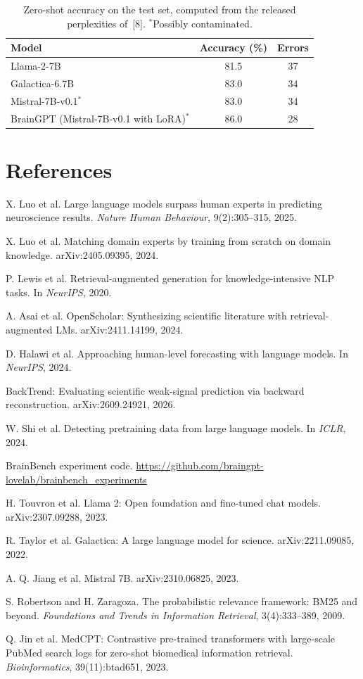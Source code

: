 \documentclass[10pt,a4paper]{article}
\begin{document}
\begin{table}[h]
\centering\small
\caption{Zero-shot accuracy on the test set, computed from the released perplexities of~[8]. $^{*}$Possibly contaminated.}
\label{tab:prelim}
\begin{tabular}{lcc}
\toprule
Model & Accuracy (\%) & Errors \\
\midrule
Llama-2-7B & 81.5 & 37 \\
Galactica-6.7B & 83.0 & 34 \\
Mistral-7B-v0.1$^{*}$ & 83.0 & 34 \\
BrainGPT (Mistral-7B-v0.1 with LoRA)$^{*}$ & 86.0 & 28 \\
\bottomrule
\end{tabular}
\end{table}

\section*{References}
\footnotesize
\begin{enumerate}[label={[\arabic*]},leftmargin=2em]
\item X. Luo et al. Large language models surpass human experts in predicting neuroscience results. \emph{Nature Human Behaviour}, 9(2):305--315, 2025.
\item X. Luo et al. Matching domain experts by training from scratch on domain knowledge. arXiv:2405.09395, 2024.
\item P. Lewis et al. Retrieval-augmented generation for knowledge-intensive NLP tasks. In \emph{NeurIPS}, 2020.
\item A. Asai et al. OpenScholar: Synthesizing scientific literature with retrieval-augmented LMs. arXiv:2411.14199, 2024.
\item D. Halawi et al. Approaching human-level forecasting with language models. In \emph{NeurIPS}, 2024.
\item BackTrend: Evaluating scientific weak-signal prediction via backward reconstruction. arXiv:2609.24921, 2026.
\item W. Shi et al. Detecting pretraining data from large language models. In \emph{ICLR}, 2024.
\item BrainBench experiment code. \url{https://github.com/braingpt-lovelab/brainbench_experiments}
\item H. Touvron et al. Llama 2: Open foundation and fine-tuned chat models. arXiv:2307.09288, 2023.
\item R. Taylor et al. Galactica: A large language model for science. arXiv:2211.09085, 2022.
\item A. Q. Jiang et al. Mistral 7B. arXiv:2310.06825, 2023.
\item S. Robertson and H. Zaragoza. The probabilistic relevance framework: BM25 and beyond. \emph{Foundations and Trends in Information Retrieval}, 3(4):333--389, 2009.
\item Q. Jin et al. MedCPT: Contrastive pre-trained transformers with large-scale PubMed search logs for zero-shot biomedical information retrieval. \emph{Bioinformatics}, 39(11):btad651, 2023.
\end{enumerate}
\end{document}
